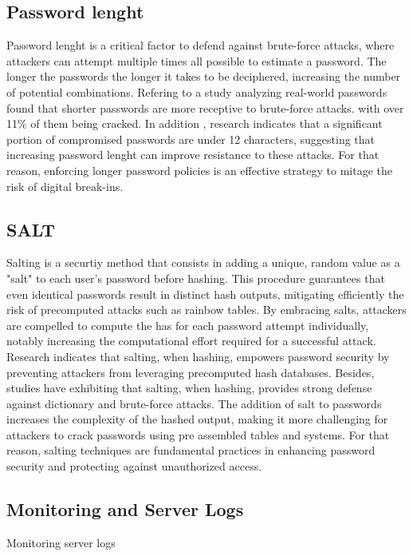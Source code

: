 \documentclass{comjnl}
\begin{document}
\subsection{Password lenght}
Password lenght is a critical factor to defend against brute-force attacks, where attackers can attempt multiple times all possible to estimate a password. The longer the passwords the longer it takes to be deciphered, increasing the number of potential combinations. Refering to a study analyzing real-world passwords found that shorter passwords are more receptive to brute-force attacks. with over 11\% of them being cracked. \cite{password_lenght} In addition , research indicates that a significant portion of compromised passwords are under 12 characters, suggesting that increasing password lenght can improve resistance to these attacks. \cite{specops} For that reason, enforcing longer password policies is an effective strategy to mitage the risk of digital break-ins. 

\subsection{SALT}
Salting is a securtiy method that consists in adding a unique, random value as a "salt" to each user's password before hashing. This procedure guarantees that even identical passwords result in distinct hash outputs, mitigating efficiently the risk of precomputed attacks such as rainbow tables. By embracing salts, attackers are compelled to compute the has for each password attempt individually, notably increasing the computational effort required for a successful attack. Research indicates that salting, when hashing, empowers password security by preventing attackers from leveraging precomputed hash databases. \cite{salting_description} Besides, studies have exhibiting that salting, when hashing, provides strong defense against dictionary and brute-force attacks. The addition of salt to passwords increases the complexity of the hashed output, making it more challenging for attackers to crack passwords using pre assembled tables and systems. \cite{salting_algo} For that reason, salting techniques are fundamental practices in enhancing password security and protecting against unauthorized access.

\subsection{Monitoring and Server Logs}

Monitoring server logs
\end{document}
